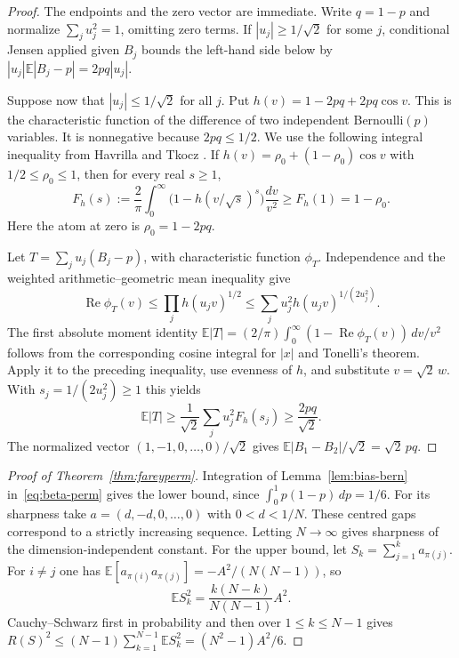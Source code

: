 \documentclass[11pt,a4paper]{article}
\begin{document}
\begin{proof}
The endpoints and the zero vector are immediate. Write $q=1-p$ and
normalize $\sum_j u_j^2=1$, omitting zero terms.
If $|u_j|\ge 1/\sqrt2$ for some $j$, conditional Jensen applied
given $B_j$ bounds the left-hand side below by
$|u_j|\mathbb E|B_j-p|=2pq|u_j|$.

Suppose now that $|u_j|\le1/\sqrt2$ for all $j$. Put
$h(v)=1-2pq+2pq\cos v$. This is the characteristic function of the
difference of two independent Bernoulli$(p)$ variables. It is
nonnegative because $2pq\le1/2$. We use the following integral
inequality from Havrilla and Tkocz \cite[proof of Theorem~8,
Section~3.4, equation (23) in the preprint]{ht}. If
$h(v)=\rho_0+(1-\rho_0)\cos v$ with $1/2\le\rho_0\le1$, then
for every real $s\ge1$,
\[
 F_h(s):=\frac2\pi\int_0^\infty
   \bigl(1-h(v/\sqrt s)^s\bigr)\frac{dv}{v^2}
 \ge F_h(1)=1-\rho_0.
\]
Here the atom at zero is $\rho_0=1-2pq$.

Let $T=\sum_j u_j(B_j-p)$, with characteristic function $\phi_T$.
Independence and the weighted arithmetic--geometric mean inequality give
\[
 \operatorname{Re}\phi_T(v)
 \le \prod_j h(u_jv)^{1/2}
 \le \sum_j u_j^2 h(u_jv)^{1/(2u_j^2)} .
\]
The first absolute moment identity
$\mathbb E|T|=(2/\pi)\int_0^\infty(1-\operatorname{Re}\phi_T(v))\,dv/v^2$
follows from the corresponding cosine integral for $|x|$ and Tonelli's
theorem. Apply it to the preceding inequality, use evenness of $h$,
and substitute $v=\sqrt2\,w$. With $s_j=1/(2u_j^2)\ge1$ this yields
\[
 \mathbb E|T|\ge
 \frac1{\sqrt2}\sum_j u_j^2 F_h(s_j)
 \ge \frac{2pq}{\sqrt2}.
\]
The normalized vector $(1,-1,0,\ldots,0)/\sqrt2$ gives
$\mathbb E|B_1-B_2|/\sqrt2=\sqrt2\,pq$.
\end{proof}

\begin{proof}[Proof of Theorem~\ref{thm:fareyperm}]
Integration of Lemma~\ref{lem:bias-bern} in~\eqref{eq:beta-perm}
gives the lower bound, since $\int_0^1p(1-p)\,dp=1/6$.
For its sharpness take $a=(d,-d,0,\ldots,0)$ with $0<d<1/N$.
These centred gaps correspond to a strictly increasing sequence.
Letting $N\to\infty$ gives sharpness of the dimension-independent
constant. For the upper bound, let $S_k=\sum_{j=1}^k a_{\pi(j)}$.
For $i\ne j$ one has $\mathbb E[a_{\pi(i)}a_{\pi(j)}]
=-A^2/(N(N-1))$, so
\[
 \mathbb E S_k^2=\frac{k(N-k)}{N(N-1)}A^2.
\]
Cauchy--Schwarz first in probability and then over $1\le k\le N-1$
gives $R(S)^2\le (N-1)\sum_{k=1}^{N-1}\mathbb E S_k^2
=(N^2-1)A^2/6$.
\end{proof}
\end{document}
